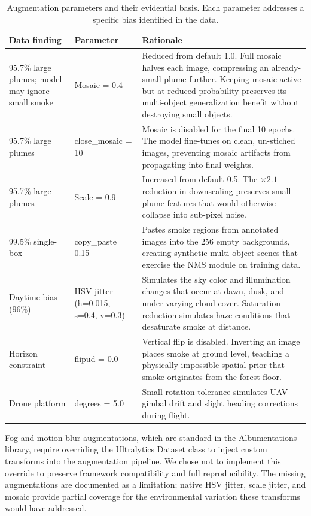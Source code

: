 \documentclass[10pt,twocolumn]{article}
\begin{document}
\begin{table}[H]
\centering
\caption{Augmentation parameters and their evidential basis. Each parameter addresses a specific bias identified in the data.}
\label{tab:augs}
\small
\begin{tabular}{@{}p{}p{}p{}@{}}
\toprule
\textbf{Data finding} & \textbf{Parameter} & \textbf{Rationale} \\
\midrule
95.7\% large plumes; model may ignore small smoke & Mosaic = 0.4 & Reduced from default 1.0. Full mosaic halves each image, compressing an already-small plume further. Keeping mosaic active but at reduced probability preserves its multi-object generalization benefit without destroying small objects. \\
95.7\% large plumes & close\_mosaic = 10 & Mosaic is disabled for the final 10 epochs. The model fine-tunes on clean, un-stiched images, preventing mosaic artifacts from propagating into final weights. \\
95.7\% large plumes & Scale = 0.9 & Increased from default 0.5. The \(\times2.1\) reduction in downscaling preserves small plume features that would otherwise collapse into sub-pixel noise. \\
99.5\% single-box & copy\_paste = 0.15 & Pastes smoke regions from annotated images into the 256 empty backgrounds, creating synthetic multi-object scenes that exercise the NMS module on training data. \\
Daytime bias (96\%) & HSV jitter (h=0.015, s=0.4, v=0.3) & Simulates the sky color and illumination changes that occur at dawn, dusk, and under varying cloud cover. Saturation reduction simulates haze conditions that desaturate smoke at distance. \\
Horizon constraint & flipud = 0.0 & Vertical flip is disabled. Inverting an image places smoke at ground level, teaching a physically impossible spatial prior that smoke originates from the forest floor. \\
Drone platform & degrees = 5.0 & Small rotation tolerance simulates UAV gimbal drift and slight heading corrections during flight. \\
\bottomrule
\end{tabular}
\end{table}

Fog and motion blur augmentations, which are standard in the Albumentations library, require overriding the Ultralytics Dataset class to inject custom transforms into the augmentation pipeline. We chose not to implement this override to preserve framework compatibility and full reproducibility. The missing augmentations are documented as a limitation; native HSV jitter, scale jitter, and mosaic provide partial coverage for the environmental variation these transforms would have addressed.
\end{document}
